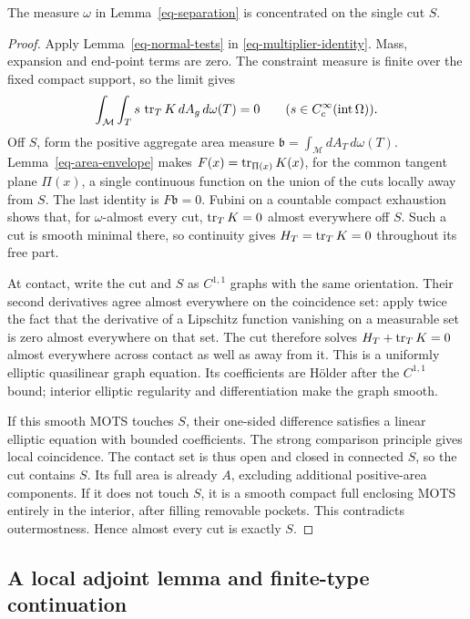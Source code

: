 \begin{lemma}
\label{eq-area-concentration}
The measure \(\omega\) in Lemma~\ref{eq-separation} is concentrated on
the single cut \(S\).
\end{lemma}

\begin{proof}
Apply Lemma~\ref{eq-normal-tests} in
\eqref{eq-multiplier-identity}.  Mass, expansion and end-point terms
are zero.  The constraint measure is finite over the fixed compact
support, so the limit gives
\[
 \int_{\mathcal M}\int_T s\,\operatorname{tr}_TK\,dA_g\,d\omega(T)=0
       \qquad(s\in C_c^\infty(\operatorname{int}\Omega)).
\]
Off \(S\), form the positive aggregate area measure
\(\mathfrak b=\int_{\mathcal M}dA_T\,d\omega(T)\).
Lemma~\ref{eq-area-envelope} makes
\(F(x)=\operatorname{tr}_{\Pi(x)}K(x)\), for the common tangent plane \(\Pi(x)\),
a single continuous function on the union of the cuts locally
away from \(S\).  The last identity is \(F\mathfrak b=0\).
Fubini on a countable compact exhaustion shows that, for
\(\omega\)-almost every cut, \(\operatorname{tr}_TK=0\) almost everywhere off
\(S\).  Such a cut is smooth minimal there, so continuity gives
\(H_T=\operatorname{tr}_TK=0\) throughout its free part.

At contact, write the cut and \(S\) as \(C^{1,1}\) graphs with the
same orientation.  Their second derivatives agree almost everywhere
on the coincidence set: apply twice the fact that the derivative
of a Lipschitz function vanishing on a measurable set is zero
almost everywhere on that set.  The cut therefore solves
\(H_T+\operatorname{tr}_TK=0\) almost everywhere across contact as well as away
from it.  This is a uniformly elliptic quasilinear graph equation.
Its coefficients are Hölder after the \(C^{1,1}\) bound; interior
elliptic regularity and differentiation make the graph smooth.

If this smooth MOTS touches \(S\), their one-sided difference
satisfies a linear elliptic equation with bounded coefficients.
The strong comparison principle gives local coincidence.
The contact set is thus open and closed in connected \(S\), so
the cut contains \(S\).  Its full area is already \(A\), excluding
additional positive-area components.  If it does not touch \(S\),
it is a smooth compact full enclosing MOTS entirely in the interior,
after filling removable pockets.  This contradicts outermostness.
Hence almost every cut is exactly \(S\).
\end{proof}

\subsection{A local adjoint lemma and finite-type continuation}

